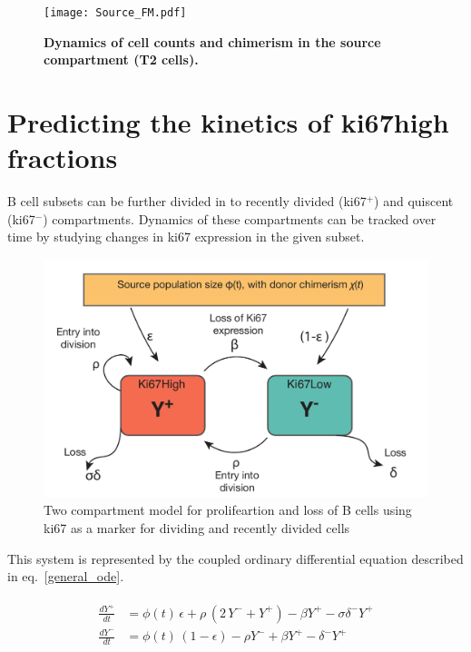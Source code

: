 \documentclass[11.5pt]{article}
\begin{document}
\begin{figure}[h!]
	\centerline{\texttt{[image: Source\_FM.pdf]}}
	\caption{\small \textbf{Dynamics of cell counts and chimerism in the source compartment (T2 cells).}  }
	\label{fig:Source_FM}
\end{figure}

\section*{Predicting the kinetics of ki67high fractions}

B cell subsets can be further divided in to recently divided (ki67$^+$) and quiscent (ki67$^-$) compartments. Dynamics of these compartments can  be tracked over time by studying changes in ki67 expression in the given subset.

\begin{figure}[htbp]
	\centerline{\includegraphics[scale = 0.5] {TwoComp_ki67.pdf}}
	\caption{Two compartment model for prolifeartion and loss of B cells using ki67 as a marker for dividing and recently divided cells \label{fig1}}
\end{figure}

This system is represented by the coupled ordinary differential equation described in eq.~\ref{general_ode}.

\begin{eqnarray}
\begin{aligned}
\frac{dY^+}{dt} &= \phi(t) \, \epsilon + \rho \, (2\, Y^- + Y^+) - \beta Y^+ - \sigma \delta^- Y^+ \\
\frac{dY^-}{dt} &= \phi(t) \, (1-\epsilon) - \rho Y^-  + \beta Y^+ - \delta^- Y^+
\end{aligned}
\label{general_ode}
\end{eqnarray}
\end{document}
